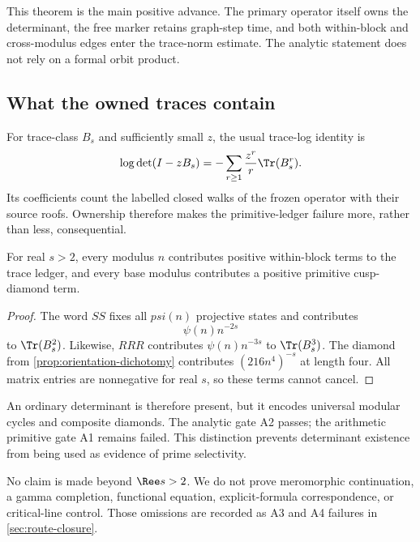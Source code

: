This theorem is the main positive advance.  The primary operator itself owns
the determinant, the free marker retains graph-step time, and both
within-block and cross-modulus edges enter the trace-norm estimate.  The
analytic statement does not rely on a formal orbit product.

\subsection{What the owned traces contain}

For trace-class $B_s$ and sufficiently small $z$, the usual trace-log identity
is
\[
 \log\det(I-zB_s)
 =-\sum_{r\ge1}\frac{z^r}{r}\Tr(B_s^r).
\]
Its coefficients count the labelled closed walks of the frozen operator with
their source roofs.  Ownership therefore makes the primitive-ledger failure
more, rather than less, consequential.

\begin{proposition}
\label{prop:composite-traces}
For real $s>2$, every modulus $n$ contributes positive within-block terms to
the trace ledger, and every base modulus contributes a positive primitive
cusp-diamond term.
\end{proposition}

\begin{proof}
The word $SS$ fixes all $psi(n)$ projective states and contributes
\[
 \psi(n)n^{-2s}
\]
to $\Tr(B_s^2)$.  Likewise, $RRR$ contributes
$\psi(n)n^{-3s}$ to $\Tr(B_s^3)$.  The diamond from
\cref{prop:orientation-dichotomy} contributes $(216n^4)^{-s}$ at length four.
All matrix entries are nonnegative for real $s$, so these terms cannot cancel.
\end{proof}

An ordinary determinant is therefore present, but it encodes universal
modular cycles and composite diamonds.  The analytic gate A2 passes; the
arithmetic primitive gate A1 remains failed.  This distinction prevents
determinant existence from being used as evidence of prime selectivity.

No claim is made beyond $\Ree s>2$.  We do not prove meromorphic continuation,
a gamma completion, functional equation, explicit-formula correspondence, or
critical-line control.  Those omissions are recorded as A3 and A4 failures in
\cref{sec:route-closure}.
